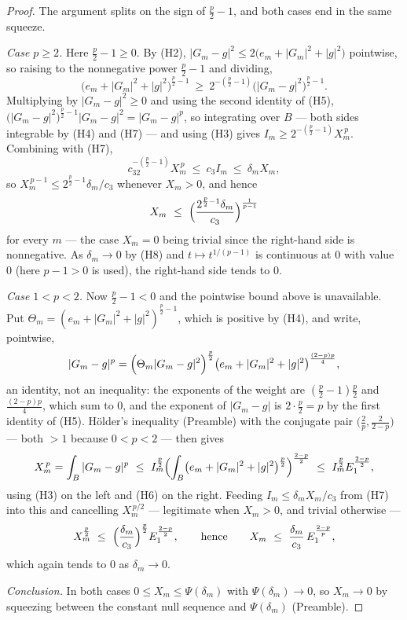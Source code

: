 \begin{proof}
The argument splits on the sign of $\tfrac p2-1$, and both cases end in the
same squeeze.

\emph{Case $p\ge2$.}  Here $\tfrac p2-1\ge0$.  By (H2),
$|G_m-g|^2\le2\bigl(e_m+|G_m|^2+|g|^2\bigr)$ pointwise, so raising to the
nonnegative power $\tfrac p2-1$ and dividing,
\[
\bigl(e_m+|G_m|^2+|g|^2\bigr)^{\frac p2-1}
\ \ge\ 2^{-(\frac p2-1)}\bigl(|G_m-g|^2\bigr)^{\frac p2-1}.
\]
Multiplying by $|G_m-g|^2\ge0$ and using the second identity of (H5),
$\bigl(|G_m-g|^2\bigr)^{\frac p2-1}|G_m-g|^2=|G_m-g|^{p}$, so integrating over
$B$ --- both sides integrable by (H4) and (H7) --- and using (H3) gives
$I_m\ge2^{-(\frac p2-1)}X_m^{\,p}$.  Combining with (H7),
\[
c_32^{-(\frac p2-1)}X_m^{\,p}\ \le\ c_3I_m\ \le\ \delta_mX_m ,
\]
so $X_m^{\,p-1}\le2^{\frac p2-1}\delta_m/c_3$ whenever $X_m>0$, and hence
\[
X_m\ \le\ \Bigl(\frac{2^{\frac p2-1}\delta_m}{c_3}\Bigr)^{\frac1{p-1}}
\]
for every $m$ --- the case $X_m=0$ being trivial since the right-hand side is
nonnegative.  As $\delta_m\to0$ by (H8) and $t\mapsto t^{1/(p-1)}$ is
continuous at $0$ with value $0$ (here $p-1>0$ is used), the right-hand side
tends to $0$.

\emph{Case $1<p<2$.}  Now $\tfrac p2-1<0$ and the pointwise bound above is
unavailable.  Put $\Theta_m=(e_m+|G_m|^2+|g|^2)^{\frac p2-1}$, which is
positive by (H4), and write, pointwise,
\[
|G_m-g|^{p}
=\Bigl(\Theta_m|G_m-g|^2\Bigr)^{\frac p2}
 \bigl(e_m+|G_m|^2+|g|^2\bigr)^{\frac{(2-p)p}{4}} ,
\]
an identity, not an inequality: the exponents of the weight are
$(\tfrac p2-1)\tfrac p2$ and $\tfrac{(2-p)p}4$, which sum to $0$, and the
exponent of $|G_m-g|$ is $2\cdot\tfrac p2=p$ by the first identity of (H5).
Hölder's inequality (Preamble) with the conjugate pair
$\bigl(\tfrac2p,\tfrac2{2-p}\bigr)$ --- both $>1$ because $0<p<2$ --- then
gives
\[
X_m^{\,p}=\int_B|G_m-g|^{p}
\ \le\ I_m^{\frac p2}
  \Bigl(\int_B\bigl(e_m+|G_m|^2+|g|^2\bigr)^{\frac p2}\Bigr)^{\frac{2-p}2}
\ \le\ I_m^{\frac p2}E_1^{\frac{2-p}2},
\]
using (H3) on the left and (H6) on the right.  Feeding $I_m\le\delta_mX_m/c_3$
from (H7) into this and cancelling $X_m^{\,p/2}$ --- legitimate when $X_m>0$,
and trivial otherwise ---
\[
X_m^{\frac p2}\ \le\ \Bigl(\frac{\delta_m}{c_3}\Bigr)^{\frac p2}E_1^{\frac{2-p}2},
\qquad\text{hence}\qquad
X_m\ \le\ \frac{\delta_m}{c_3}\,E_1^{\frac{2-p}p},
\]
which again tends to $0$ as $\delta_m\to0$.

\emph{Conclusion.}  In both cases $0\le X_m\le\Psi(\delta_m)$ with
$\Psi(\delta_m)\to0$, so $X_m\to0$ by squeezing between the constant null
sequence and $\Psi(\delta_m)$ (Preamble).
\end{proof}
